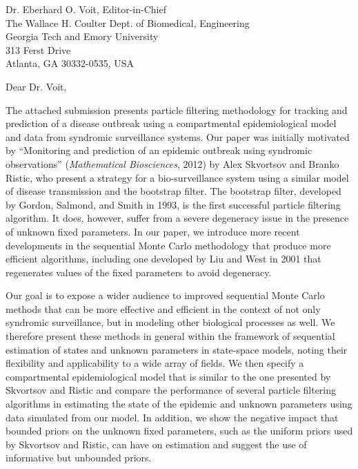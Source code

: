 \documentclass{letter} %
\begin{document}
\signature{Daniel M. Sheinson, Jarad Niemi, and Wendy Meiring}           %
\longindentation=0pt                       %
\let\raggedleft\raggedright                %

\begin{letter}{Dr. Eberhard O. Voit, Editor-in-Chief \\
The Wallace H. Coulter Dept. of Biomedical, Engineering \\
Georgia Tech and Emory University \\
313 Ferst Drive \\
Atlanta, GA 30332-0535, USA
}

\opening{Dear Dr. Voit,}

\noindent The attached submission presents particle filtering methodology for tracking and prediction of a disease outbreak using a compartmental epidemiological model and data from syndromic surveillance systems. Our paper was initially motivated by ``Monitoring and prediction of an epidemic outbreak using syndromic observations'' (\emph{Mathematical Biosciences}, 2012) by Alex Skvortsov and Branko Ristic, who present a strategy for a bio-surveillance system using a similar model of disease transmission and the bootstrap filter. The bootstrap filter, developed by Gordon, Salmond, and Smith in 1993, is the first successful particle filtering algorithm. It does, however, suffer from a severe degeneracy issue in the presence of unknown fixed parameters. In our paper, we introduce more recent developments in the sequential Monte Carlo methodology that produce more efficient algorithms, including one developed by Liu and West in 2001 that regenerates values of the fixed parameters to avoid degeneracy.

Our goal is to expose a wider audience to improved sequential Monte Carlo methods that can be more effective and efficient in the context of not only syndromic surveillance, but in modeling other biological processes as well. We therefore present these methods in general within the framework of sequential estimation of states and unknown parameters in state-space models, noting their flexibility and applicability to a wide array of fields. We then specify a compartmental epidemiological model that is similar to the one presented by Skvortsov and Ristic and compare the performance of several particle filtering algorithms in estimating the state of the epidemic and unknown parameters using data simulated from our model. In addition, we show the negative impact that bounded priors on the unknown fixed parameters, such as the uniform priors used by Skvortsov and Ristic, can have on estimation and suggest the use of informative but unbounded priors.


\end{letter}
\end{document}
